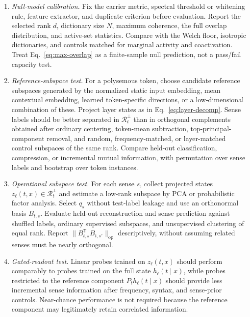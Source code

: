 \documentclass[
  aps,
  reprint,
  superscriptaddress,
  floatfix,
  nofootinbib,
  longbibliography
]{revtex4-2}
\newcommand{\T}{^{\mathsf{T}}}
\newcommand{\opnorm}[1]{\lVert #1 \rVert_{\mathrm{op}}}
\begin{document}
\begin{enumerate}
\item \emph{Null-model calibration.}
Fix the carrier metric, spectral threshold or whitening rule, feature extractor,
and duplicate criterion before evaluation.  Report the selected rank $d$,
dictionary size $N$, maximum coherence, the full overlap distribution, and
active-set statistics.  Compare with the Welch floor, isotropic dictionaries,
and controls matched for marginal activity and coactivation.  Treat
Eq.~\eqref{eq:max-overlap} as a finite-sample null prediction, not a pass/fail
capacity test.

\item \emph{Reference-subspace test.}
For a polysemous token, choose candidate reference subspaces generated
by the normalized static input embedding, mean contextual embedding,
learned token-specific directions, or a low-dimensional combination of
these. Project layer states as in Eq.~\eqref{eq:layer-decomp}. Sense labels
should be better separated in $\mathcal R_t^\perp$ than in orthogonal
complements obtained after ordinary centering, token-mean subtraction,
top-principal-component removal, and random, frequency-matched, or
layer-matched control subspaces of the same rank.  Compare held-out
classification, compression, or incremental mutual information, with
permutation over sense labels and bootstrap over token instances.

\item \emph{Operational subspace test.}
For each sense $s$, collect projected states
$z_\ell(t,x)\in\mathcal R_t^\perp$ and estimate a low-rank subspace by PCA or
probabilistic factor analysis. Select $q_s$ without test-label leakage and use
an orthonormal basis $B_{t,s}$.  Evaluate held-out reconstruction and sense
prediction against shuffled labels, ordinary supervised subspaces, and
unsupervised clustering of equal rank.  Report
$\opnorm{B_{t,s}\T B_{t,s'}}$ descriptively, without assuming related senses
must be nearly orthogonal.

\item \emph{Gated-readout test.}
Linear probes trained on $z_\ell(t,x)$ should perform comparably to
probes trained on the full state $h_\ell(t\mid x)$, while probes
restricted to the reference component $P_t h_\ell(t\mid x)$ should provide
less incremental sense information after frequency, syntax, and sense-prior
controls.  Near-chance performance is not required because the reference
component may legitimately retain correlated information.


\end{enumerate}
\end{document}
